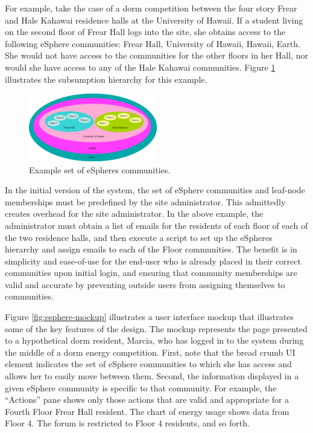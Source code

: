For example, take the case of a dorm competition between the four story
Frear and Hale Kahawai residence halls at the University of Hawaii. If a
student living on the second floor of Frear Hall logs into the site, she
obtains access to the following eSphere communities: Frear Hall, University
of Hawaii, Hawaii, Earth.  She would not have access to the communities for
the other floors in her Hall, nor would she have access to any of the Hale
Kahawai communities.  Figure \ref{fig:espheres} illustrates the subsumption
hierarchy for this example.

\begin{figure}[th]
  \center
  \includegraphics[width=0.5\textwidth]{espheres.eps}
  \caption{\small Example set of eSpheres communities.}
 \label{fig:espheres}
\end{figure} 

In the initial version of the system, the set of eSphere communities and
leaf-node memberships must be predefined by the site administrator. This
admittedly creates overhead for the site administrator. In the above
example, the administrator must obtain a list of emails for the residents
of each floor of each of the two residence halls, and then execute a script
to set up the eSpheres hierarchy and assign emails to each of the Floor
communities. The benefit is in simplicity and ease-of-use for the end-user
who is already placed in their correct communities upon initial login, 
and ensuring that community memberships are valid and accurate by
preventing outside users from assigning themselves to communities.

Figure \ref{fig:esphere-mockup} illustrates a user interface mockup that
illustrates some of the key features of the design.  The mockup represents
the page presented to a hypothetical dorm resident, Marcia, who has logged
in to the system during the middle of a dorm energy competition.  First,
note that the bread crumb UI element indicates the set of eSphere
communities to which she has access and allows her to easily move between
them.  Second, the information displayed in a given eSphere community is
specific to that community.  For example, the ``Actions'' pane shows only
those actions that are valid and appropriate for a Fourth Floor Frear Hall
resident.  The chart of energy usage shows data from Floor 4.  The forum is
restricted to Floor 4 residents, and so forth.  


